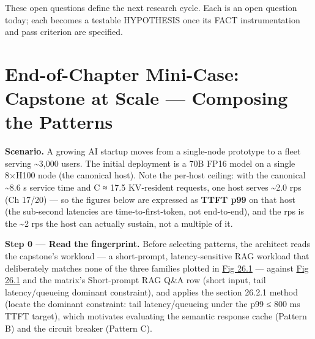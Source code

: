 These open questions define the next research cycle. Each is an open
question today; each becomes a testable HYPOTHESIS once its FACT
instrumentation and pass criterion are specified.

\section{End-of-Chapter Mini-Case: Capstone at Scale --- Composing the
Patterns}\label{end-of-chapter-mini-case-capstone-at-scale-composing-the-patterns}

\textbf{Scenario.} A growing AI startup moves from a single-node
prototype to a fleet serving \textasciitilde3,000 users. The initial
deployment is a 70B FP16 model on a single 8×H100 node (the canonical
host). Note the per‑host ceiling: with the canonical \textasciitilde8.6
s service time and C ≈ 17.5 KV‑resident requests, one host serves
\textasciitilde2.0 rps (Ch 17/20) --- so the figures below are expressed
as \textbf{TTFT p99} on that host (the sub‑second latencies are
time‑to‑first‑token, not end‑to‑end), and the rps is the
\textasciitilde2 rps the host can actually sustain, not a multiple of
it.

\textbf{Step 0 --- Read the fingerprint.} Before selecting patterns, the
architect reads the capstone's workload --- a short-prompt,
latency-sensitive RAG workload that deliberately matches none of the
three families plotted in \hyperref[fig:26.1]{Fig 26.1} --- against \hyperref[fig:26.1]{Fig 26.1} and the matrix's
Short-prompt RAG Q\&A row (short input, tail latency/queueing dominant
constraint), and applies the section 26.2.1 method (locate the dominant
constraint: tail latency/queueing under the p99 ≤ 800 ms TTFT target),
which motivates evaluating the semantic response cache (Pattern B) and
the circuit breaker (Pattern C).

